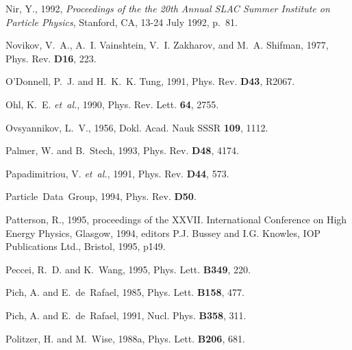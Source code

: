 \begin{thebibliography}{\protect{}1991}
Nir, Y., 1992,
 {\em Proceedings of the the 20th Annual SLAC Summer
  Institute on Particle Physics}, {\rm Stanford, CA, 13-24 July 1992, p.\ 81}.

Novikov, V.~A., A.~I. Vainshtein, V.~I. Zakharov, and M.~A. Shifman, 1977,
\newblock Phys. Rev. {\bf D16}, 223.

{O'Donnell}, P.~J. and H.~K.~K. Tung, 1991,
\newblock Phys. Rev. {\bf D43}, R2067.

Ohl, K.~E. {\em et~al.\/}, 1990,
\newblock Phys. Rev. Lett. {\bf 64}, 2755.

Ovsyannikov, L.~V., 1956,
\newblock Dokl. Acad. Nauk SSSR {\bf 109}, 1112.

Palmer, W. and B.~Stech, 1993,
\newblock Phys. Rev. {\bf D48}, 4174.

Papadimitriou, V. {\em et~al.\/}, 1991,
\newblock Phys. Rev. {\bf D44}, 573.

{Particle~Data~Group}, 1994,
\newblock Phys. Rev. {\bf D50}.

Patterson, R., 1995,
\newblock proceedings of the XXVII. International Conference on High Energy
  Physics, Glasgow, 1994, editors P.J. Bussey and I.G. Knowles, IOP
  Publications Ltd., Bristol, 1995, p\. 149.

Peccei, R.~D. and K.~Wang, 1995,
\newblock Phys. Lett. {\bf B349}, 220.

Pich, A. and E.~de~Rafael, 1985,
\newblock Phys. Lett. {\bf B158}, 477.

Pich, A. and E.~de~Rafael, 1991,
\newblock Nucl. Phys. {\bf B358}, 311.

Politzer, H. and M.~Wise, 1988a,
\newblock Phys. Lett. {\bf B206}, 681.


\end{thebibliography}
